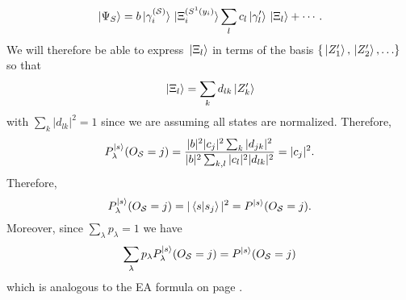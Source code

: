 \begin{equation*}
\ket*{\Psi_S}=b\ket*{\gamma_i^{(\mathcal{S})}}\ket*{\Xi_i^{(S^1(y_i)}}\sum_lc_l\ket*{\gamma_l'}\ket*{\Xi_l}+\cdots.
\end{equation*}
We will therefore be able to express
$\ket*{\Xi_l}$ in terms of the basis $\{\ket*{Z_1'}, \ket*{Z_2'},\ldots  \}$ so that 
\begin{equation*}
\ket*{\Xi_l}= \sum_k d_{lk}\ket*{Z_k'}
\end{equation*}
with $\sum_{k}|d_{lk}|^2=1$ since we are assuming all states are normalized. Therefore,
\begin{equation*}
P_\lambda^{\ket*{s}}(O_{\mathcal{S}}=j)=\frac{|b|^2|c_j|^2\sum_k |d_{jk}|^2}{|b|^2\sum_{k,l} |c_l|^2 |d_{lk}|^2}= |c_j|^2.
\end{equation*}
Therefore, \begin{equation*}
P_\lambda^{\ket*{s}}(O_{\mathcal{S}}=j)=|\ip*{s}{s_j}|^2=P^{\ket*{s}}(O_{\mathcal{S}}=j).
\end{equation*} Moreover, since $\sum_\lambda p_\lambda =1$ we have 
\begin{equation*}
\sum_\lambda p_\lambda P_\lambda^{\ket*{s}}(O_{\mathcal{S}}=j)= P^{\ket*{s}}(O_{\mathcal{S}}=j)
\end{equation*}
which is analogous to the EA formula on page \pageref{adeq}.
